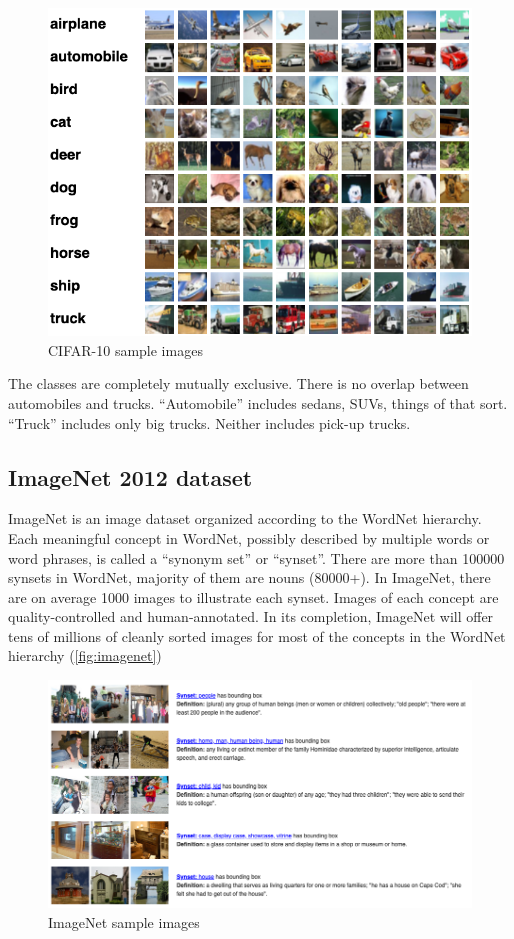 \begin{figure}[ht]
    \includegraphics[width=\textwidth]{images/results/CIFAR_10.png}
    \centering
    \caption{CIFAR-10 sample images}\label{fig:CIFAR_10}
\end{figure}

The classes are completely mutually exclusive. There is no overlap between
automobiles and trucks. ``Automobile'' includes sedans, SUVs, things of that
sort. ``Truck'' includes only big trucks. Neither includes pick-up trucks.

\subsection{ImageNet 2012 dataset}
ImageNet is an image dataset organized according to the WordNet hierarchy. Each
meaningful concept in WordNet, possibly described by multiple words or word
phrases, is called a ``synonym set'' or ``synset''. There are more than 100000
synsets in WordNet, majority of them are nouns (80000+). In ImageNet, there are
on average 1000 images to illustrate each synset.
Images of each concept are quality-controlled and human-annotated. In its
completion, ImageNet will offer tens of millions of cleanly sorted images for
most of the concepts in the WordNet hierarchy (\autoref{fig:imagenet})

\begin{figure}[ht]
    \includegraphics[width=\textwidth]{images/results/imagenet.png}
    \centering
    \caption{ImageNet sample images}\label{fig:imagenet}
\end{figure}

